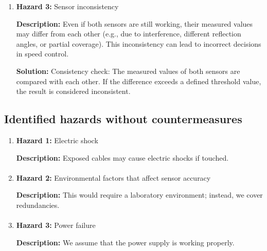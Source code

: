 \begin{enumerate}
        \paragraph{}
		\item \textbf{Hazard 3:} Sensor inconsistency
            
            \textbf{Description:} Even if both sensors are still working, their measured values may differ from each other (e.g., due to interference, different reflection angles, or partial coverage). This inconsistency can lead to incorrect decisions in speed control.
            
            \textbf{Solution:} Consistency check: The measured values of both sensors are compared with each other. If the difference exceeds a defined threshold value, the result is considered inconsistent.
        
        \paragraph{}
	\end{enumerate}
	
\subsection{Identified hazards without countermeasures }

	\begin{enumerate}
		\item \textbf{Hazard 1:} Electric shock

            \textbf{Description:} Exposed cables may cause electric shocks if touched.
            
        \paragraph{}
		\item \textbf{Hazard 2:} Environmental factors that affect sensor accuracy
        
            \textbf{Description:} This would require a laboratory environment; instead, we cover redundancies.

        \paragraph{}
		\item \textbf{Hazard 3:} Power failure
        
            \textbf{Description:} We assume that the power supply is working properly.


	\end{enumerate}